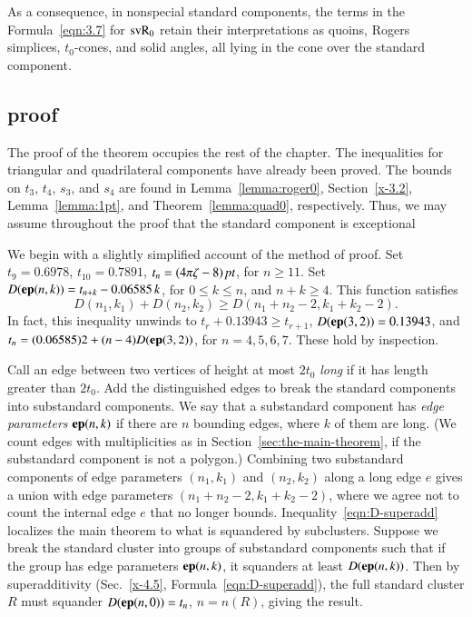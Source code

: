 As a consequence, in nonspecial standard components, the terms in the
Formula~\ref{eqn:3.7} for ${\operatorname{svR}}_0$ retain their interpretations as
quoins, Rogers simplices, $t_0$-cones, and solid angles, all lying
in the cone over the standard component.


\subsection{proof} %

The proof of the theorem occupies the rest of the chapter. The
inequalities for triangular and quadrilateral components have already
been proved. The bounds on $t_3$, $t_4$, $s_3$, and $s_4$ are
found in Lemma~\ref{lemma:roger0}, Section~\ref{x-3.2},
Lemma~\ref{lemma:1pt}, and Theorem~\ref{lemma:quad0},
respectively. Thus, we may assume throughout the proof that the
standard component is exceptional

We begin with a slightly simplified account of the method of
proof. Set $t_9=0.6978$, $t_{10}= 0.7891$, $t_n=(4\pi\zeta-8)\,\hbox{\it pt}$, for
$n\ge 11$. Set $D({\operatorname{\bf ep}}{(n,k)}) = t_{n+k} - 0.06585\,k$, for $0\le k\le n$,
and $n+k\ge 4$. This function satisfies
    \begin{equation}
    D(n_1,k_1)+D(n_2,k_2)\ge D(n_1+n_2-2,k_1+k_2-2).
    \label{eqn:D-superadd}
    \end{equation}
In fact, this inequality unwinds to $t_r+0.13943\ge t_{r+1}$,
$D({\operatorname{\bf ep}}{(3,2)})=0.13943$, and $t_n =(0.06585)2+(n-4)D({\operatorname{\bf ep}}{(3,2)})$, for $n=4,5,6,7$.
These hold  by inspection.

Call an edge between two vertices of height at most $2t_0$ {\it long\/}
if it has length greater than $2t_0$. Add the distinguished edges to
break the standard components into substandard components. We say that a substandard component has
{\it edge parameters} ${\operatorname{\bf ep}}{(n,k)}$ if there are $n$ bounding edges, where $k$
of them are long. (We count edges with multiplicities as in
Section~\ref{sec:the-main-theorem}, if the substandard component is not a polygon.)
Combining two substandard components of edge parameters $(n_1,k_1)$ and $(n_2,k_2)$
along a long edge $e$ gives a union with edge parameters
$(n_1+n_2-2,k_1+k_2-2)$, where we agree not to count the internal edge
$e$ that no longer bounds. Inequality~\ref{eqn:D-superadd} localizes the
main theorem to what is squandered by subclusters. Suppose we break the
standard cluster into groups of substandard components such that if the group has
edge parameters ${\operatorname{\bf ep}}{(n,k)}$, it squanders at least $D({\operatorname{\bf ep}}{(n,k)})$. Then by
superadditivity (Sec.~\ref{x-4.5}, Formula~\ref{eqn:D-superadd}), the
full standard cluster $R$ must squander $D({\operatorname{\bf ep}}{(n,0)}) = t_n$, $n=n(R)$, giving
the result.

